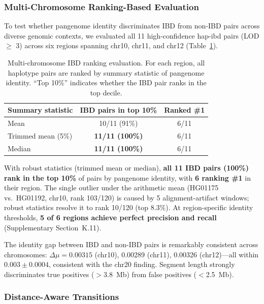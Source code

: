 \subsubsection{Multi-Chromosome Ranking-Based Evaluation}
\label{sec:multi_chr_ground_truth}

To test whether pangenome identity discriminates IBD from non-IBD pairs across diverse genomic contexts, we evaluated all 11 high-confidence hap-ibd pairs (LOD $\geq$ 3) across six regions spanning chr10, chr11, and chr12 (Table~\ref{tab:ranking_summary}).

\begin{table}[ht]
\centering
\caption{Multi-chromosome IBD ranking evaluation. For each region, all haplotype pairs are ranked by summary statistic of pangenome identity. ``Top 10\%'' indicates whether the IBD pair ranks in the top decile.}
\label{tab:ranking_summary}
\begin{tabular}{lcc}
\hline
\textbf{Summary statistic} & \textbf{IBD pairs in top 10\%} & \textbf{Ranked \#1} \\
\hline
Mean & 10/11 (91\%) & 6/11 \\
Trimmed mean (5\%) & \textbf{11/11 (100\%)} & 6/11 \\
Median & \textbf{11/11 (100\%)} & 6/11 \\
\hline
\end{tabular}
\end{table}

With robust statistics (trimmed mean or median), \textbf{all 11 IBD pairs (100\%) rank in the top 10\%} of pairs by pangenome identity, with \textbf{6 ranking \#1} in their region. The single outlier under the arithmetic mean (HG01175 vs.\ HG01192, chr10, rank 103/120) is caused by 5 alignment-artifact windows; robust statistics resolve it to rank 10/120 (top 8.3\%). At region-specific identity thresholds, \textbf{5 of 6 regions achieve perfect precision and recall} (Supplementary Section~K.11).

The identity gap between IBD and non-IBD pairs is remarkably consistent across chromosomes: $\Delta\mu = 0.00315$ (chr10), 0.00289 (chr11), 0.00326 (chr12)---all within $0.003 \pm 0.0004$, consistent with the chr20 finding. Segment length strongly discriminates true positives ($>$3.8~Mb) from false positives ($<$2.5~Mb).

\subsubsection{Distance-Aware Transitions}

